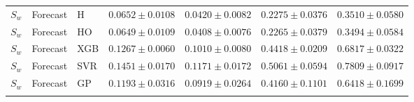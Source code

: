 \begin{table}[t]
\begin{tabular}{@{}cllcccc@{}}
\addlinespace[1pt]
$S_w$ & Forecast & H & $0.0652\pm0.0108$ & $0.0420\pm0.0082$ & $0.2275\pm0.0376$ & $0.3510\pm0.0580$ \\
$S_w$ & Forecast & HO & $0.0649\pm0.0109$ & $0.0408\pm0.0076$ & $0.2265\pm0.0379$ & $0.3494\pm0.0584$ \\
$S_w$ & Forecast & XGB & $0.1267\pm0.0060$ & $0.1010\pm0.0080$ & $0.4418\pm0.0209$ & $0.6817\pm0.0322$ \\
$S_w$ & Forecast & SVR & $0.1451\pm0.0170$ & $0.1171\pm0.0172$ & $0.5061\pm0.0594$ & $0.7809\pm0.0917$ \\
$S_w$ & Forecast & GP & $0.1193\pm0.0316$ & $0.0919\pm0.0264$ & $0.4160\pm0.1101$ & $0.6418\pm0.1699$ \\
\addlinespace[1pt]
\bottomrule
\end{tabular}
\end{table}
